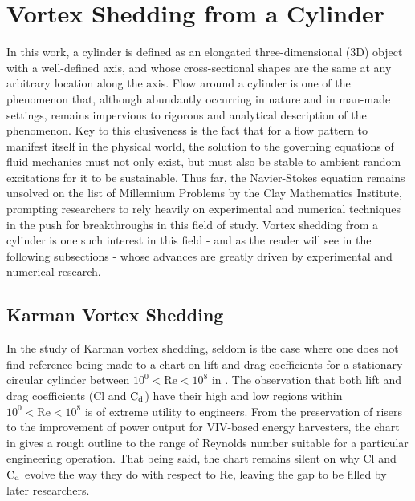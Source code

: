 \documentclass[oneside]{utmthesis}
\begin{document}
\section{Vortex Shedding from a Cylinder}
In this work, a cylinder is defined as an elongated three-dimensional (3D) object with a well-defined axis, and whose cross-sectional shapes are the same at any arbitrary location along the axis. Flow around a cylinder is one of the phenomenon that, although abundantly occurring in nature and in man-made settings, remains impervious to rigorous and analytical description of the phenomenon. Key to this elusiveness is the fact that for a flow pattern to manifest itself in the physical world, the solution to the governing equations of fluid mechanics must not only exist, but must also be stable to ambient random excitations for it to be sustainable. Thus far, the Navier-Stokes equation remains unsolved on the list of Millennium Problems by the Clay Mathematics Institute, prompting researchers to rely heavily on experimental and numerical techniques in the push for breakthroughs in this field of study. Vortex shedding from a cylinder is one such interest in this field - and as the reader will see in the following subsections - whose advances are greatly driven by experimental and numerical research.

\subsection{Karman Vortex Shedding} \label{ssec:kvShedding}
In the study of Karman vortex shedding, seldom is the case where one does not find reference being made to a chart on lift and drag coefficients for a stationary circular cylinder between $10^{0} < \text{Re} < 10^{8}$ in \citet{Zdravkovich1997}. The observation that both lift and drag coefficients (Cl and $\text{C}_{\text{d}}$) have their high and low regions within $10^{0} < \text{Re} < 10^{8}$ is of extreme utility to engineers. From the preservation of risers to the improvement of power output for VIV-based energy harvesters, the chart in \citet{Zdravkovich1997} gives a rough outline to the range of Reynolds number suitable for a particular engineering operation. That being said, the chart remains silent on why Cl and $\text{C}_{\text{d}}$ evolve the way they do with respect to Re, leaving the gap to be filled by later researchers.
\end{document}
